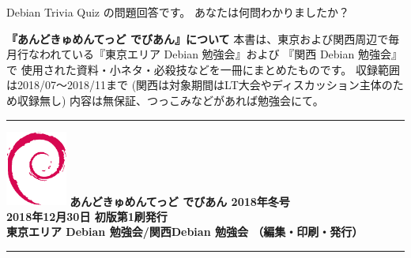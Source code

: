 \documentclass[mingoth,a4paper]{jsarticle}
\begin{document}

 Debian Trivia Quiz の問題回答です。
 あなたは何問わかりましたか？ \\


\newpage
\thispagestyle{empty}\mbox{}
\newpage

\thispagestyle{empty}
{
\large
\begin{itembox}{\bf 『あんどきゅめんてっど でびあん』について}
本書は、東京および関西周辺で毎月行なわれている『東京エリア Debian 勉強会』および
『関西 Debian 勉強会』で
使用された資料・小ネタ・必殺技などを一冊にまとめたものです。
収録範囲は2018/07〜2018/11まで
(関西は対象期間はLT大会やディスカッション主体のため収録無し)
内容は無保証、つっこみなどがあれば勉強会にて。
\end{itembox}
}

\vspace*{16cm}
{\color{dancerlightblue}\rule{\hsize}{1mm}}
\vspace{2mm}
\includegraphics[width=2cm]{image200502/openlogo-nd.eps}
\noindent \Large \bf あんどきゅめんてっど でびあん 2018年冬号\\
\noindent \normalfont 2018年12月30日 \hspace{5mm}  初版第1刷発行\\
\noindent \normalfont 東京エリア Debian 勉強会/関西Debian 勉強会 （編集・印刷・発行）\\
{\color{dancerdarkblue}\rule{\hsize}{1mm}}
\end{document}
